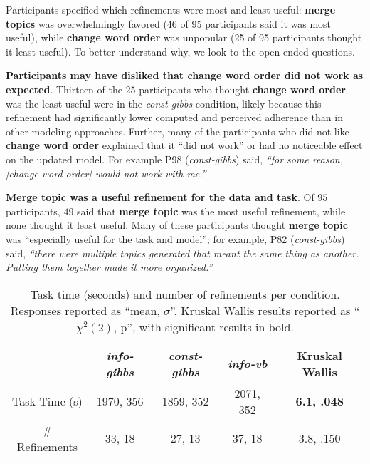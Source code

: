 Participants specified which refinements were most and least useful: \textbf{merge topics} was overwhelmingly favored (46 of 95 participants said it was most useful), while
\textbf{change word order} was unpopular (25 of 95 participants thought it least useful).
To better understand why, 
 we look to the open-ended questions.

\textbf{Participants may have disliked that change word order did not work as expected}.
Thirteen of the $25$ participants who thought \textbf{change word order} was the least useful were in the
\textit{const-gibbs} condition, likely because
this refinement had significantly lower computed and perceived
adherence than in other modeling approaches. Further,
many of the participants who did not like \textbf{change word order} explained that it ``did not work'' or had no noticeable effect on the updated
model. For example P98 (\textit{const-gibbs}) said, \textit{``for some reason, [change word order] would not work with me.''} 

\textbf{Merge topic was a useful refinement for the data and task}.
Of $95$ participants, $49$ said that \textbf{merge topic} was the most
useful refinement, while none thought it least useful. Many of these participants thought \textbf{merge topic} was ``especially useful for the task and model''; for example, P82 (\textit{const-gibbs}) said, \textit{``there were multiple topics generated that meant the same thing as another. Putting them together made it more organized.''} 



 








\begin{table}[t]
  \caption{Task time (seconds) and number of refinements per condition. Responses reported as ``mean, $\sigma$''. Kruskal
    Wallis results reported as
    ``${\chi}^2(2)$, p'', with significant results in bold.}
  \label{tab:effort}
    \begin{center}
    \small
      \begin{tabular}{c c c c c}
        \hline
         & \textit{info-gibbs} & \textit{const-gibbs} & \textit{info-vb} & Kruskal Wallis \\
        \hline \hline
        Task Time (s) & 1970, 356 & 1859, 352 & 2071, 352 & \textbf{6.1, .048} \\
        \# Refinements & 33, 18 & 27, 13 & 37, 18 & 3.8, .150 \\
        \hline
      \end{tabular}
    \end{center}
    \bigskip\centering
\end{table}
